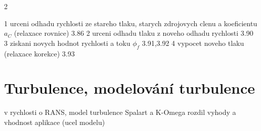 2

1 urceni odhadu rychlosti ze stareho tlaku, starych zdrojovych clenu a koeficientu $ a_C $ (relaxace rovnice) 3.86
2 urceni odhadu tlaku z noveho odhadu rychlosti 3.90
3 ziskani novych hodnot rychlosti a toku $ \phi_f $ 3.91,3.92
4 vypocet noveho tlaku (relaxace korekce) 3.93

\section{Turbulence, modelování turbulence}
v rychlosti o RANS, model turbulence Spalart a K-Omega rozdil vyhody a vhodnost aplikace (ucel modelu)